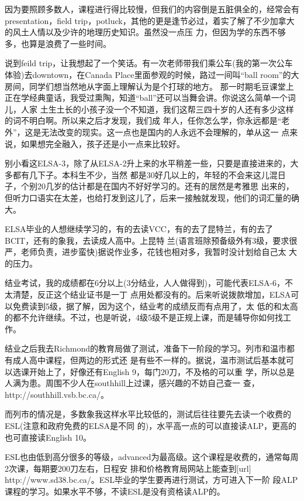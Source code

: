 \documentclass[11pt,a4paper,onecolumn]{article}
\begin{document}
因为要照顾多数人，课程进行得比较慢，但我们的内容倒是五脏俱全的，经常会有presentation，field
trip，potluck，其他的更是逢节必过，着实了解了不少加拿大的风土人情以及少许的地理历史知识。虽然没一点压
力，但因为学的东西不够多，也算是浪费了一些时间。


说到feild trip，让我想起了一个笑话。有一次老师带我们乘公车(我的第一次公车体验)去downtown，在Canada
Place里面参观的时候，路过一间叫``ball room''的大房间，同学们想当然地从字面上理解认为是个打球的地方。
那一时期毛豆课堂上正在学经典童话，我受过熏陶，知道``ball''还可以当舞会讲。你说这么简单一个词儿，人家
土生土长的小孩子没一个不知道，我们这帮三四十岁的人还有多少这样的词不明白啊。所以来之后才发现，我们成
年人，任你怎么学，你永远都是``老外''，这是无法改变的现实。这一点也是国内的人永远不会理解的，单从这一
点来说，如果想完全融入，孩子还是小一点来比较好。


别小看这ELSA-3，除了从ELSA-2升上来的水平稍差一些，只要是直接进来的，大多都有几下子。本科生不少，当然
都是30好几以上的，年轻的不会来这儿混日子，个别20几岁的估计都是在国内不好好学习的。还有的居然是考雅思
出来的，但听力口语实在太差，也给打发到这儿了，后来一接触就发现，他们的词汇量的确大。


ELSA毕业的人想继续学习的，有的去读VCC，有的去了昆特兰，有的去了BCIT，还有的象我，去读成人高中。上昆特
兰(语言班除预备级外有3级，要求很严，老师负责，进步蛮快)据说作业多，花钱也相对多，我暂时没计划给自己太
大的压力。


结业考试，我的成绩都在6分以上(3分结业，人人做得到)，可能代表ELSA-6，不太清楚，反正这个结业证书是一丁
点用处都没有的。后来听说拨款增加，ELSA可以免费读到5级，据了解，因为这个，结业考的成绩反而有点用了，太
低的和太高的都不允许继续。不过，也是听说，4级5级不是正规上课，而是辅导你如何找工作。


结业之后我去Richmond的教育局做了测试，准备下一阶段的学习。列市和温市都有成人高中课程，但两边的形式还
是有些不一样的。据说，温市测试后基本就可以选课开始上了，好像还有English 9，每门20刀，不及格的可以重
学，所以总是人满为患。周围不少人在southhill上过课，感兴趣的不妨自己查一
查，http://southhill.vsb.bc.ca/。


而列市的情况是，多数象我这样水平比较低的，测试后往往要先去读一个收费的ESL(注意和政府免费的ELSA是不同
的)，水平高一点的可以直接读ALP，更高的也可直接读English 10。


ESL也由低到高分很多的等级，advanced为最高级。这个课程是收费的，通常每周2次课，每期要200刀左右，日程安
排和价格教育局网站上能查到$[$url$]$http://www.sd38.bc.ca/。ESL毕业的学生要再进行测试，方可进入下一阶
段ALP课程的学习。如果水平不够，不读ESL是没有资格读ALP的。
\end{document}
